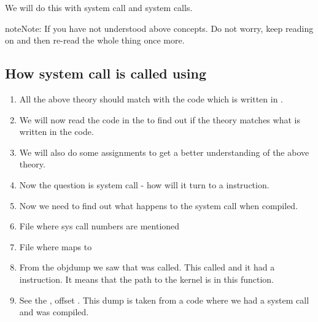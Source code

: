 \documentclass[letterpaper,10pt,english]{sphinxmanual}
\begin{document}
We will do this with  system call and  system calls.

\begin{sphinxadmonition}{note}{Note:}
If you have not understood above concepts. Do not worry, keep reading
on and then re-read the whole thing once more.
\end{sphinxadmonition}


\subsection{How  system call is called using }
\label{\detokenize{06_setting_up_arguements:how-open-system-call-is-called-using-glibc}}\begin{enumerate}
\item {} 
All the above theory should match with the code which is written in .

\item {} 
We will now read the code in the  to find out if the theory matches
what is written in the code.

\item {} 
We will also do some assignments to get a better understanding of the above theory.

\item {} 
Now the question is  system call - how will it turn to a 
instruction.

\item {} 
Now we need to find out what happens to the  system call when compiled.

\item {} 
File where sys call numbers are mentioned

\item {} 
File where  maps to 

\item {} 
From the objdump we saw that  was called. This called
 and it had a  instruction. It means that the
path to the kernel is in this function.

\item {} 
See the , offset . This dump is taken from a code where we had a
 system call and was compiled.

\end{enumerate}
\end{document}
